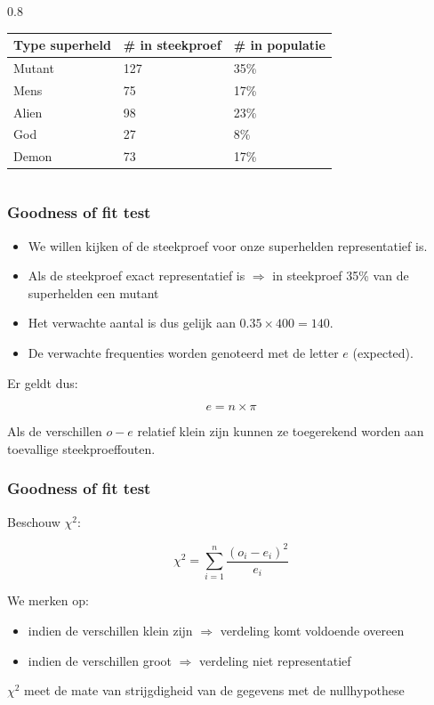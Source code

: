 \documentclass[aspectratio=169]{beamer}
\begin{document}
\begin{frame}
\begin{columns}
    \begin{column} { 0.8 \textwidth}
    \begin{table}[h]
\begin{tabular}{@{}lll@{}}
\toprule
\textbf{Type superheld} & \textbf{\# in steekproef} & \textbf{\# in populatie} \\ \midrule
Mutant                  & 127                       & 35\%                     \\
Mens                    & 75                        & 17\%                     \\
Alien                   & 98                        & 23\%                     \\
God                     & 27                        & 8\%                     \\
Demon                   & 73                        & 17\%                      \\ \bottomrule
\end{tabular}
\end{table}
    \end{column}
  \end{columns}
\end{frame}

\begin{frame}
  \frametitle{Goodness of fit test}
\begin{itemize}
  \item We willen kijken of de steekproef voor onze superhelden representatief is.
  \item Als de steekproef exact representatief is $\Rightarrow$ in steekproef 35\% van de superhelden een mutant
  \item Het verwachte aantal is dus gelijk aan $0.35 \times 400 = 140$.
  \item De verwachte frequenties worden genoteerd met de letter $e$ (expected).
\end{itemize}
 Er geldt dus:

\[ e = n \times \pi \]

Als de verschillen $o - e$  relatief klein zijn kunnen ze toegerekend worden aan toevallige steekproeffouten.
\end{frame}

\begin{frame}
  \frametitle{Goodness of fit test}
  Beschouw $\chi^{2}$:

\[ \chi^{2} = \sum_{i=1}^{n} \frac{(o_{i} - e_{i})^{2}}{e_{i}} \]

We merken op:
\begin{itemize}
  \item indien de verschillen klein zijn $\Rightarrow$ verdeling komt voldoende overeen
  \item indien de verschillen groot $\Rightarrow$ verdeling niet representatief
\end{itemize}

$\chi^{2}$ meet de mate van strijgdigheid van de gegevens met de nullhypothese
\end{frame}
\end{document}
